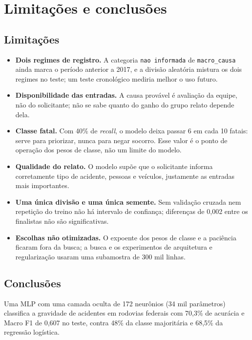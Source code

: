 \chapter{Limitações e conclusões}
\label{cap:conclusao}

\section{Limitações}
\label{sec:limitacoes}

\begin{itemize}
  \item \textbf{Dois regimes de registro.} A categoria \texttt{nao informada} de \texttt{macro\_causa} ainda marca o período anterior a 2017, e a divisão aleatória mistura os dois regimes no teste; um teste cronológico mediria melhor o uso futuro.
  \item \textbf{Disponibilidade das entradas.} A causa provável é avaliação da equipe, não do solicitante; não se sabe quanto do ganho do grupo relato depende dela.
  \item \textbf{Classe fatal.} Com 40\% de \textit{recall}, o modelo deixa passar 6 em cada 10 fatais: serve para priorizar, nunca para negar socorro. Esse valor é o ponto de operação dos pesos de classe, não um limite do modelo.
  \item \textbf{Qualidade do relato.} O modelo supõe que o solicitante informa corretamente tipo de acidente, pessoas e veículos, justamente as entradas mais importantes.
  \item \textbf{Uma única divisão e uma única semente.} Sem validação cruzada nem repetição do treino não há intervalo de confiança; diferenças de 0,002 entre os finalistas não são significativas.
  \item \textbf{Escolhas não otimizadas.} O expoente dos pesos de classe e a paciência ficaram fora da busca; a busca e os experimentos de arquitetura e regularização usaram uma subamostra de 300 mil linhas.
\end{itemize}

\section{Conclusões}
\label{sec:conclusao}

Uma MLP com uma camada oculta de 172 neurônios (34 mil parâmetros) classifica a gravidade de acidentes em rodovias federais com 70,3\% de acurácia e Macro F1 de 0,607 no teste, contra 48\% da classe majoritária e 68,5\% da regressão logística.

